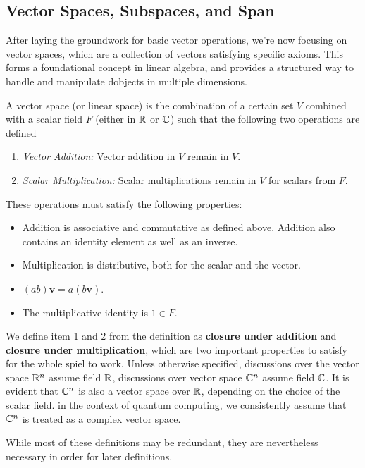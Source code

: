 \documentclass[12pt]{article}
\begin{document}
\subsection{Vector Spaces, Subspaces, and Span}

After laying the groundwork for basic vector operations, we're now focusing on vector spaces, which are a collection of vectors satisfying specific axioms. This forms a foundational concept in linear algebra, and provides a structured way to handle and manipulate dobjects in multiple dimensions. 

\begin{definition}
    A vector space (or linear space) is the combination of a certain set $V$ combined with a scalar field $F$ (either in $\mathbb{R}$ or $\mathbb{C}$) such that the following two operations are defined
    \begin{enumerate}
        \item \emph{Vector Addition:} Vector addition in $V$ remain in $V$.
        \item \emph{Scalar Multiplication:} Scalar multiplications remain in $V$ for scalars from $F$. 
    \end{enumerate}
    These operations must satisfy the following properties:
    \begin{itemize}
        \item Addition is associative and commutative as defined above. Addition also contains an identity element as well as an inverse.
        \item Multiplication is distributive, both for the scalar and the vector. 
        \item $(ab)\mathbf{v} = a(b\mathbf{v})$.
        \item The multiplicative identity is $1 \in F$.    
    \end{itemize}
\end{definition}

We define item 1 and 2 from the definition as \textbf{closure under addition} and \textbf{closure under multiplication}, which are two important properties to satisfy for the whole spiel to work. Unless otherwise specified, discussions over the vector space $\mathbb{R}^n$ assume field $\mathbb{R}$, discussions over vector space $\mathbb{C}^n$ assume field $\mathbb{C}$. It is evident that $\mathbb{C}^n$ is also a vector space over $\mathbb{R}$, depending on the choice of the scalar field. in the context of quantum computing, we consistently assume that $\mathbb{C}^n$ is treated as a complex vector space. 

While most of these definitions may be redundant, they are nevertheless necessary in order for later definitions.
\end{document}
